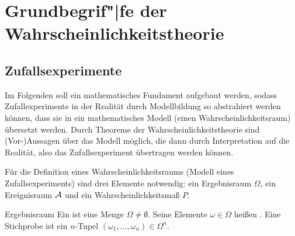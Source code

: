 \chapter{%
    Grundbegrif"|fe der Wahrscheinlichkeitstheorie%
}

\section{%
    Zufallsexperimente%
}

\begin{Bem}
    Im Folgenden soll ein mathematisches Fundament aufgebaut werden, sodass
    Zufallexperimente in der Realität durch Modellbildung so abstrahiert werden können,
    dass sie in ein mathematisches Modell (einen Wahrscheinlichkeitsraum) übersetzt werden.
    Durch Theoreme der Wahrscheinlichkeitstheorie sind (Vor-)Aussagen über das Modell möglich,
    die dann durch Interpretation auf die Realität, also das Zufallsexperiment übertragen werden
    können.
\end{Bem}

\linie

\begin{Bem}
    Für die Definition eines Wahrscheinlichkeitsraums (Modell eines Zufallsexperiments)
    sind drei Elemente notwendig:
    ein Ergebnisraum $\Omega$,
    ein Ereignisraum $\mathcal{A}$ und
    ein Wahrscheinlichkeitsmaß $P$.
\end{Bem}

\begin{Def}{Ergebnisraum}
    Ein  ist eine Menge $\Omega \not= \emptyset$.
    Seine Elemente $\omega \in \Omega$ heißen .
    Eine Stichprobe ist ein $n$-Tupel $(\omega_1, \dotsc, \omega_n) \in \Omega^n$.
\end{Def}

